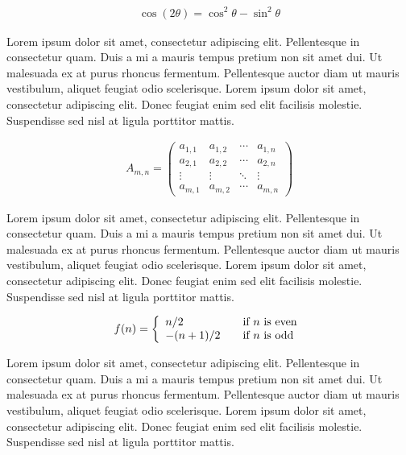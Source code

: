 	\begin{equation}
		\begin{aligned}
			\cos (2\theta) = \cos^2 \theta - \sin^2 \theta
		\end{aligned}
	\end{equation}

Lorem ipsum dolor sit amet, consectetur adipiscing elit. Pellentesque in consectetur quam. Duis a mi a mauris tempus pretium non sit amet dui. Ut malesuada ex at purus rhoncus fermentum. Pellentesque auctor diam ut mauris vestibulum, aliquet feugiat odio scelerisque. Lorem ipsum dolor sit amet, consectetur adipiscing elit. Donec feugiat enim sed elit facilisis molestie. Suspendisse sed nisl at ligula porttitor mattis.

	\begin{equation}
		\begin{aligned}
			A_{m,n} =
			\begin{pmatrix}
			a_{1,1} & a_{1,2} & \cdots & a_{1,n} \\
			a_{2,1} & a_{2,2} & \cdots & a_{2,n} \\
			\vdots  & \vdots  & \ddots & \vdots  \\
			a_{m,1} & a_{m,2} & \cdots & a_{m,n}
			\end{pmatrix}
		\end{aligned}
	\end{equation}

Lorem ipsum dolor sit amet, consectetur adipiscing elit. Pellentesque in consectetur quam. Duis a mi a mauris tempus pretium non sit amet dui. Ut malesuada ex at purus rhoncus fermentum. Pellentesque auctor diam ut mauris vestibulum, aliquet feugiat odio scelerisque. Lorem ipsum dolor sit amet, consectetur adipiscing elit. Donec feugiat enim sed elit facilisis molestie. Suspendisse sed nisl at ligula porttitor mattis.

	\begin{equation}
		\begin{aligned}
			f(n) = \left\{
			\begin{array}{l l}
			n/2 & \quad \text{if $n$ is even}\\
			-(n+1)/2 & \quad \text{if $n$ is odd}
			\end{array} \right.
		\end{aligned}
	\end{equation}

Lorem ipsum dolor sit amet, consectetur adipiscing elit. Pellentesque in consectetur quam. Duis a mi a mauris tempus pretium non sit amet dui. Ut malesuada ex at purus rhoncus fermentum. Pellentesque auctor diam ut mauris vestibulum, aliquet feugiat odio scelerisque. Lorem ipsum dolor sit amet, consectetur adipiscing elit. Donec feugiat enim sed elit facilisis molestie. Suspendisse sed nisl at ligula porttitor mattis.

